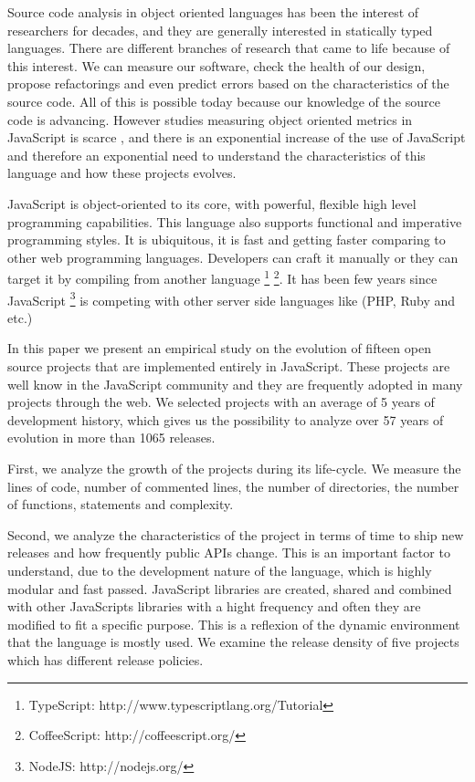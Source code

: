 
Source code analysis in object oriented languages has been the interest of researchers for decades, and they are generally interested in statically typed languages. There are different branches of research that came to life because of this interest. We can measure our software, check the health of our design, propose refactorings and even predict errors based on the characteristics of the source code. All of this is possible today because our knowledge of the source code is advancing.  However studies measuring object oriented metrics in JavaScript is scarce \cite{Richards:2010:ADB:1809028.1806598 , 6320536}, and there is an exponential increase of the use of JavaScript and therefore an exponential need to understand the characteristics of this language and how these projects evolves.

JavaScript is object-oriented to its core, with powerful, flexible high level programming capabilities. This language also supports functional and imperative programming styles. It is ubiquitous, it is fast and getting faster comparing to other web programming languages. Developers can craft it manually or they can target it by compiling from another language \footnote{TypeScript: http://www.typescriptlang.org/Tutorial} \footnote{CoffeeScript: http://coffeescript.org/}. It has been few years since JavaScript \footnote{NodeJS: http://nodejs.org/} is competing with other server side languages like (PHP, Ruby and etc.)

In this paper we present an empirical study on the evolution of fifteen open source projects that are implemented entirely in JavaScript. These projects are well know in the JavaScript community and they are frequently adopted in many projects through the web. We selected projects with an average of 5 years of development history, which gives us the possibility to analyze over 57 years of evolution in more than 1065 releases. 

First, we analyze the growth of the projects during its life-cycle. We measure the lines of code, number of commented lines, the number of directories, the number of functions, statements and complexity. 

Second, we analyze the characteristics of the project in terms of time to ship new releases and how frequently public APIs change. This is an important factor to understand, due to the development nature of the language, which is highly modular and fast passed. JavaScript libraries are created, shared and combined with other JavaScripts libraries with a hight frequency and often they are modified to fit a specific purpose. This is a reflexion of the dynamic environment that the language is mostly used. We examine the release density of five projects which has different release policies. 

